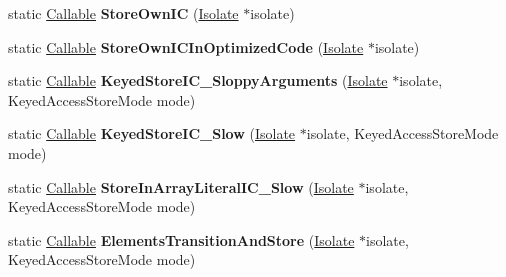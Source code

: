 \begin{DoxyCompactItemize}
\item 
\mbox{\label{classv8_1_1internal_1_1CodeFactory_ac51b64fc7fa667339b61fb7647023a79}} 
static \mbox{\hyperlink{classv8_1_1internal_1_1Callable}{Callable}} {\bfseries Store\+Own\+IC} (\mbox{\hyperlink{classv8_1_1internal_1_1Isolate}{Isolate}} $\ast$isolate)
\item 
\mbox{\label{classv8_1_1internal_1_1CodeFactory_a5f96f63f71df17acee8b92de0b5b7ef6}} 
static \mbox{\hyperlink{classv8_1_1internal_1_1Callable}{Callable}} {\bfseries Store\+Own\+I\+C\+In\+Optimized\+Code} (\mbox{\hyperlink{classv8_1_1internal_1_1Isolate}{Isolate}} $\ast$isolate)
\item 
\mbox{\label{classv8_1_1internal_1_1CodeFactory_a77285fcd93f71504d0493fc69f92ec25}} 
static \mbox{\hyperlink{classv8_1_1internal_1_1Callable}{Callable}} {\bfseries Keyed\+Store\+I\+C\+\_\+\+Sloppy\+Arguments} (\mbox{\hyperlink{classv8_1_1internal_1_1Isolate}{Isolate}} $\ast$isolate, Keyed\+Access\+Store\+Mode mode)
\item 
\mbox{\label{classv8_1_1internal_1_1CodeFactory_a15a76e434ac11f43c78d81a28f9d11a0}} 
static \mbox{\hyperlink{classv8_1_1internal_1_1Callable}{Callable}} {\bfseries Keyed\+Store\+I\+C\+\_\+\+Slow} (\mbox{\hyperlink{classv8_1_1internal_1_1Isolate}{Isolate}} $\ast$isolate, Keyed\+Access\+Store\+Mode mode)
\item 
\mbox{\label{classv8_1_1internal_1_1CodeFactory_a52a0b99e8bb686d2c84fd8631aa8d5d5}} 
static \mbox{\hyperlink{classv8_1_1internal_1_1Callable}{Callable}} {\bfseries Store\+In\+Array\+Literal\+I\+C\+\_\+\+Slow} (\mbox{\hyperlink{classv8_1_1internal_1_1Isolate}{Isolate}} $\ast$isolate, Keyed\+Access\+Store\+Mode mode)
\item 
\mbox{\label{classv8_1_1internal_1_1CodeFactory_ab3f8c7c2cd073f026189d0edd729fecd}} 
static \mbox{\hyperlink{classv8_1_1internal_1_1Callable}{Callable}} {\bfseries Elements\+Transition\+And\+Store} (\mbox{\hyperlink{classv8_1_1internal_1_1Isolate}{Isolate}} $\ast$isolate, Keyed\+Access\+Store\+Mode mode)
\item 
\mbox{\label{classv8_1_1internal_1_1CodeFactory_aa89f0da66c0bb4c048e74f03ccd89177}} 

\end{DoxyCompactItemize}
